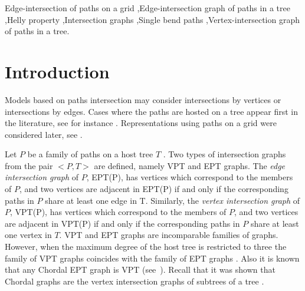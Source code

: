 \documentclass[9pt]{entcs}
\begin{document}
\begin{frontmatter}
\begin{keyword}
Edge-intersection of paths on a grid \sep Edge-intersection graph of paths in a tree  \sep Helly property \sep Intersection graphs \sep Single bend paths \sep Vertex-intersection graph of paths in a tree.
\end{keyword} 



\end{frontmatter}


\section{Introduction}

Models based on paths intersection  may consider  intersections by vertices or   intersections by edges.  Cases where the paths are hosted on a tree  appear first in the literature, see for instance \cite{gavril1978recognition, golumbic1985edge, golumbic1985}.  Representations using paths on a grid were considered later, see  \cite{golumbic2009,golumbic2013, golumbic2013intersection}. %

 Let $P$ be a family of paths on a host tree $T$ . Two types of intersection graphs from the pair $<P,T>$ are defined, namely VPT and EPT graphs.
The \textit{edge intersection graph} of $P$, EPT(P), has vertices which correspond to the members of $P$, and two vertices are adjacent in EPT(P) if and only if the corresponding paths in $P$ share at least one edge in T. Similarly, the \textit{vertex intersection graph} of $P$, VPT(P), has vertices which correspond to the members of $P$, and two vertices are adjacent in VPT(P) if and only if the corresponding paths in $P$ share at least one vertex in $T$.
%
VPT and EPT graphs are incomparable families of graphs. However, when the maximum degree of the host tree is restricted to three the family of
VPT graphs coincides with the family of EPT graphs \cite{golumbic1985edge%
}. Also it is known that any Chordal EPT graph is VPT (see~\cite{syslo1985triangulated}). Recall that it was shown that Chordal graphs are the vertex intersection graphs of subtrees of a tree \cite{gavril1974intersection}.
\end{document}

